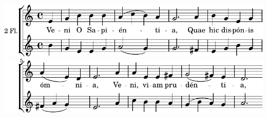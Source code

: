\includegraphics{fa618ccb7ad5b5a55bfc75f3e5f22d01-1}%
\ifx\betweenLilyPondSystem \undefined
  \linebreak
\else
  \expandafter{}%
\fi
\includegraphics{fa618ccb7ad5b5a55bfc75f3e5f22d01-2}%
